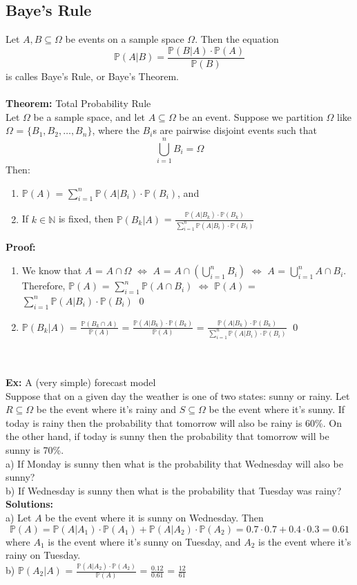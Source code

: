 \documentclass{article}
\newcommand{\N}{\mathbb{N}}
\newcommand{\bbP}{\mathbb{P}}
\newcommand{\Om}{\Omega}
\begin{document}
\subsection{Baye's Rule}
Let $A, B \subseteq \Om$ be events on a sample space $\Om$. Then the equation
\[ \bbP(A|B) = \frac{\bbP(B|A) \cdot \bbP(A)}{\bbP(B)}\]
is calles Baye's Rule, or Baye's Theorem.\\\\
\textbf{Theorem:} Total Probability Rule\\ 
Let $\Om$ be a sample space, and let $A \subseteq \Om$ be an event. Suppose we partition $\Om$ like $\Om$ = $\{$$B_{1}, B_{2}, \dots, B_{n}$$\}$, where the $B_{i}$s are pairwise disjoint events such that
\[ \bigcup_{i=1}^{n}B_{i} = \Om\]
Then:
\begin{enumerate}
	\item $\bbP(A)$ = $\sum_{i=1}^{n}$$\bbP(A|B_{i}) \cdot \bbP(B_{i})$, and
	\item If $k \in \N$ is fixed, then $\bbP(B_{k}|A)$ = $\frac{\bbP(A|B_{k}) \cdot \bbP(B_{k})}{\sum_{i=1}^{n}\bbP(A|B_{i}) \cdot \bbP(B_{i})}$
\end{enumerate}
\textbf{Proof:}
\begin{enumerate}
	\item We know that $A$ = $A \cap \Om$ $\iff$ $A$ = $A \cap (\bigcup_{i=1}^{n}B_{i})$ $\iff$ $A$ = $\bigcup_{i=1}^{n}A \cap B_{i}$. Therefore, $\bbP(A)$ = $\sum_{i=1}^{n}\bbP(A \cap B_{i})$ $\iff$ $\bbP(A)$ = $\sum_{i=1}^{n}\bbP(A|B_{i})\cdot \bbP(B_{i})$ \qed
	\item $\bbP(B_{k}|A)$ = $\frac{\bbP(B_{k} \cap A)}{\bbP(A)}$ = $\frac{\bbP(A|B_{k})\cdot \bbP(B_{k})}{\bbP(A)}$ = $\frac{\bbP(A|B_{k}) \cdot \bbP(B_{k})}{\sum_{i=1}^{n}\bbP(A|B_{i}) \cdot \bbP(B_{i})}$ \qed \\\\\\
\end{enumerate}
\textbf{Ex:} A (very simple) forecast model
\\Suppose that on a given day the weather is one of two states: sunny or rainy. Let $R \subseteq \Om$ be the event where it's rainy and $S \subseteq \Om$ be the event where it's sunny. If today is rainy then the probability that tomorrow will also be rainy is 60\%. On the other hand, if today is sunny then the probability that tomorrow will be sunny is 70\%.\\
a) If Monday is sunny then what is the probability that Wednesday will also be sunny?\\
b) If Wednesday is sunny then what is the probability that Tuesday was rainy?\\
\textbf{Solutions:}\\
a) Let $A$ be the event where it is sunny on Wednesday. Then
\[ \bbP(A) = \bbP(A|A_{1}) \cdot \bbP(A_{1}) + \bbP(A|A_{2}) \cdot \bbP(A_{2}) = 0.7 \cdot 0.7 + 0.4 \cdot 0.3 = 0.61\]
where $A_{1}$ is the event where it's sunny on Tuesday, and $A_{2}$ is the event where it's rainy on Tuesday.\\
b) $\bbP(A_{2}|A)$ = $\frac{\bbP(A|A_{2}) \cdot \bbP(A_{2})}{\bbP(A)}$ = $\frac{0.12}{0.61}$ = $\frac{12}{61}$
\end{document}
